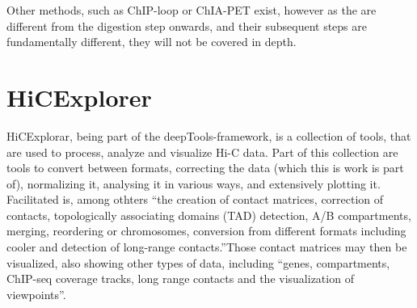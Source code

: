 Other methods, such as ChIP-loop or ChIA-PET exist, however as the are
different from the digestion step onwards, and their subsequent steps are
fundamentally different, they will not be covered in depth.





%
%
%
%
%
%






\section{HiCExplorer}\label{sec:hicexplorer}


HiCExplorar, being part of the deepTools-framework, is a collection of tools,
that are used to process, analyze and visualize Hi-C data. Part of this
collection are tools to convert between formats, correcting the data (which
this is work is part of), normalizing it, analysing it in various ways, and
extensively plotting it. Facilitated is, among othters ``the creation of
contact matrices, correction of contacts, topologically associating domains
(TAD) detection, A/B compartments, merging, reordering or chromosomes,
conversion from different formats including cooler and detection of long-range
contacts.''\footnotemark Those contact matrices may then be visualized, also
showing other types of data, including ``genes, compartments, ChIP-seq coverage
tracks, long range contacts and the visualization of
viewpoints''\footnotemark[\value{footnote}].


